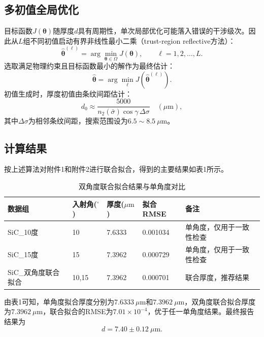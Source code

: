\documentclass[12pt,a4paper]{ctexart}
\begin{document}
	\subsection{多初值全局优化}
	目标函数$J(\boldsymbol\theta)$随厚度$d$具有周期性，单次局部优化可能落入错误的干涉级次。因此从$L$组不同初值启动有界非线性最小二乘（trust-region reflective方法）：
	\begin{equation}
		\widehat{\boldsymbol\theta}^{(\ell)} = \arg\min_{\boldsymbol\theta\in\Omega} J(\boldsymbol\theta),\qquad \ell=1,2,\ldots,L.
	\end{equation}
	选取满足物理约束且目标函数最小的解作为最终估计：
	\begin{equation}
		\widehat{\boldsymbol\theta} = \arg\min_{\ell} J\left(\widehat{\boldsymbol\theta}^{(\ell)}\right).
		\label{eq:multi_start}
	\end{equation}
	初值生成时，厚度初值由条纹间距估计：
	\begin{equation}
		d_0 \approx \frac{5000}{n_2(\bar\sigma)\cos\gamma\,\Delta\sigma}\quad(\mu\mathrm{m}),
		\label{eq:init_thick}
	\end{equation}
	其中$\Delta\sigma$为相邻条纹间距，搜索范围设为$6.5\sim8.5\ \mu\mathrm{m}$。
	
	\subsection{计算结果}
	按上述算法对附件1和附件2进行联合拟合，得到的主要结果如表1所示。
	
	\begin{table}[htbp]
		\centering
		\caption{双角度联合拟合结果与单角度对比}
		\label{tab:results}
		\begin{tabularx}{0.95\textwidth}{C{2.8cm}C{2.8cm}C{2.2cm}C{2.6cm}C{2.8cm}}
			\toprule
			\bfseries
			\textbf{数据组} & \textbf{入射角($^\circ$)} & \textbf{厚度($\mu\mathrm{m}$)} & \textbf{拟合RMSE} & \textbf{备注} \\
			\midrule
			SiC\_10度 & 10 & 7.6333 & 0.001034 & 单角度，仅用于一致性检查 \\
			SiC\_15度 & 15 & 7.3962 & 0.000729 & 单角度，仅用于一致性检查 \\
			SiC\_双角度联合拟合 & 10,15 & 7.3962 & 0.000701 & 联合厚度，推荐结果 \\
			\bottomrule
		\end{tabularx}
	\end{table}
	
	由表1可知，单角度拟合厚度分别为$7.6333\ \mu\mathrm{m}$和$7.3962\ \mu\mathrm{m}$，双角度联合拟合厚度为$7.3962\ \mu\mathrm{m}$，联合拟合的RMSE为$7.01\times10^{-4}$，优于任一单角度结果。最终报告结果为
	\begin{equation}
		\boxed{d = 7.40\pm 0.12\ \mu\mathrm{m}.}
	\end{equation}
	
\end{document}

